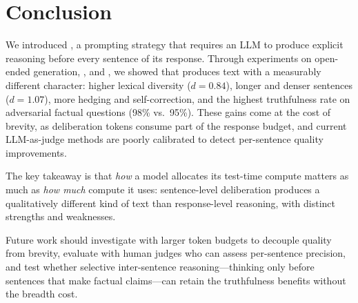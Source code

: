 \section{Conclusion}
\label{sec:conclusion}

We introduced \iscot, a prompting strategy that requires an LLM to produce explicit reasoning before every sentence of its response.
Through experiments on open-ended generation, \truthfulqa, and \gsmk, we showed that \iscotshort produces text with a measurably different character: higher lexical diversity ($d = 0.84$), longer and denser sentences ($d = 1.07$), more hedging and self-correction, and the highest truthfulness rate on adversarial factual questions (98\% vs.\ 95\%).
These gains come at the cost of brevity, as deliberation tokens consume part of the response budget, and current LLM-as-judge methods are poorly calibrated to detect per-sentence quality improvements.

The key takeaway is that \emph{how} a model allocates its test-time compute matters as much as \emph{how much} compute it uses: sentence-level deliberation produces a qualitatively different kind of text than response-level reasoning, with distinct strengths and weaknesses.

Future work should investigate \iscotshort with larger token budgets to decouple quality from brevity, evaluate with human judges who can assess per-sentence precision, and test whether selective inter-sentence reasoning---thinking only before sentences that make factual claims---can retain the truthfulness benefits without the breadth cost.
